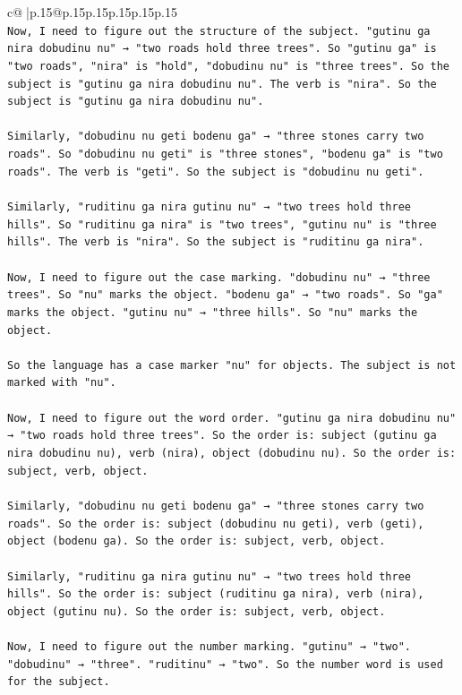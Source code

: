 \documentclass{article}
\begin{document}
{\begin{supertabular}{c@{$\;$}|p{.15\linewidth}@{}p{.15\linewidth}p{.15\linewidth}p{.15\linewidth}p{.15\linewidth}p{.15\linewidth}}
{{{\\ 
\texttt{Now, I need to figure out the structure of the subject. "gutinu ga nira dobudinu nu" → "two roads hold three trees". So "gutinu ga" is "two roads", "nira" is "hold", "dobudinu nu" is "three trees". So the subject is "gutinu ga nira dobudinu nu". The verb is "nira". So the subject is "gutinu ga nira dobudinu nu".} \\
\\ 
\texttt{Similarly, "dobudinu nu geti bodenu ga" → "three stones carry two roads". So "dobudinu nu geti" is "three stones", "bodenu ga" is "two roads". The verb is "geti". So the subject is "dobudinu nu geti".} \\
\\ 
\texttt{Similarly, "ruditinu ga nira gutinu nu" → "two trees hold three hills". So "ruditinu ga nira" is "two trees", "gutinu nu" is "three hills". The verb is "nira". So the subject is "ruditinu ga nira".} \\
\\ 
\texttt{Now, I need to figure out the case marking. "dobudinu nu" → "three trees". So "nu" marks the object. "bodenu ga" → "two roads". So "ga" marks the object. "gutinu nu" → "three hills". So "nu" marks the object.} \\
\\ 
\texttt{So the language has a case marker "nu" for objects. The subject is not marked with "nu".} \\
\\ 
\texttt{Now, I need to figure out the word order. "gutinu ga nira dobudinu nu" → "two roads hold three trees". So the order is: subject (gutinu ga nira dobudinu nu), verb (nira), object (dobudinu nu). So the order is: subject, verb, object.} \\
\\ 
\texttt{Similarly, "dobudinu nu geti bodenu ga" → "three stones carry two roads". So the order is: subject (dobudinu nu geti), verb (geti), object (bodenu ga). So the order is: subject, verb, object.} \\
\\ 
\texttt{Similarly, "ruditinu ga nira gutinu nu" → "two trees hold three hills". So the order is: subject (ruditinu ga nira), verb (nira), object (gutinu nu). So the order is: subject, verb, object.} \\
\\ 
\texttt{Now, I need to figure out the number marking. "gutinu" → "two". "dobudinu" → "three". "ruditinu" → "two". So the number word is used for the subject.} \\
}}}
\end{supertabular}}
\end{document}
